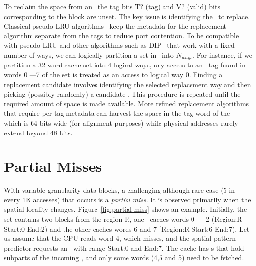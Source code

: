 To reclaim the space from an \AB\, the tag bits T? (tag) and V? (valid) bits corresponding to the block are unset. The key issue is identifying the \AB\ to replace. Classical pseudo-LRU algorithms~\cite{Kedzierski-ipdps-2010,manual:OpenSparcT1} keep the metadata for the replacement algorithm separate from the tags to reduce port contention. To be compatible with pseudo-LRU and other algorithms such as DIP~\cite{qureshi-isca-2007} that work with a fixed number of ways, we can logically partition a set in \AC\ into $N_{ways}$. For instance, if we partition a 32 word cache set into 4 logical ways, any access to an \AB\ tag found in words 0 ---7 of the set is treated as an access to logical way 0. Finding a replacement candidate involves identifying the selected replacement way and then picking (possibly randomly) a candidate \AB{}. This procedure is repeated until the required amount of space is made available. More refined replacement algorithms that require per-tag metadata can harvest the space in the tag-word of the \AB\, which is 64 bits wide (for alignment purposes) while physical addresses rarely extend beyond 48 bits.

\section{Partial Misses} 
\label{sec:partialmiss} 

With variable granularity data blocks, a challenging although rare case (5 in every 1K accesses) that occurs is a \textit{partial miss}. It is observed primarily when the spatial locality changes.  Figure~\ref{fig:partial-miss} shows an example. Initially, the set contains two blocks from the region R, one \AB\ caches words 0 --- 2 (Region:R Start:0 End:2) and the other caches words 6 and 7 (Region:R Start:6 End:7). Let us assume that the CPU reads word 4, which misses, and the spatial pattern predictor requests an \AB\ with range Start:0 and End:7. The cache has \AB{}s that hold subparts of the incoming \AB{}, and only some words (4,5 and 5) need to be fetched.

